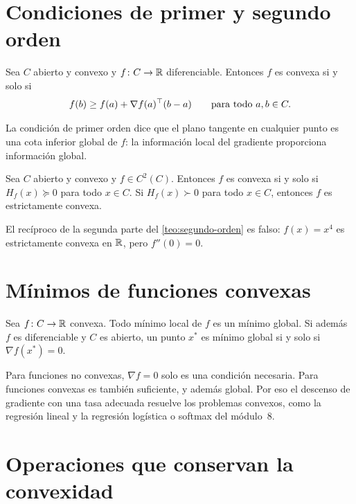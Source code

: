 \section{Condiciones de primer y segundo orden}

\begin{teorema}\label{teo:primer-orden}
Sea $C$ abierto y convexo y $f\colon C\to\mathbb{R}$ diferenciable. Entonces $f$ es convexa si y solo si
\[
f(b)\ge f(a)+\nabla f(a)^{\top}(b-a)\qquad\text{para todo } a,b\in C.
\]
\end{teorema}

La condición de primer orden dice que el plano tangente en cualquier punto es una cota inferior global de $f$: la información local del gradiente proporciona información global.

\begin{teorema}\label{teo:segundo-orden}
Sea $C$ abierto y convexo y $f\in C^{2}(C)$. Entonces $f$ es convexa si y solo si $H_f(x)\succeq 0$ para todo $x\in C$. Si $H_f(x)\succ 0$ para todo $x\in C$, entonces $f$ es estrictamente convexa.
\end{teorema}

\addtocounter{definicion}{1}%

\begin{observacion}
El recíproco de la segunda parte del \cref{teo:segundo-orden} es falso: $f(x)=x^{4}$ es estrictamente convexa en $\mathbb{R}$, pero $f''(0)=0$.
\end{observacion}

\section{Mínimos de funciones convexas}

\begin{teorema}\label{teo:local-global}
Sea $f\colon C\to\mathbb{R}$ convexa. Todo mínimo local de $f$ es un mínimo global. Si además $f$ es diferenciable y $C$ es abierto, un punto $x^{*}$ es mínimo global si y solo si $\nabla f(x^{*})=0$.
\end{teorema}

Para funciones no convexas, $\nabla f=0$ solo es una condición necesaria. Para funciones convexas es también suficiente, y además global. Por eso el descenso de gradiente con una tasa adecuada resuelve los problemas convexos, como la regresión lineal y la regresión logística o softmax del módulo~8.

\section{Operaciones que conservan la convexidad}

